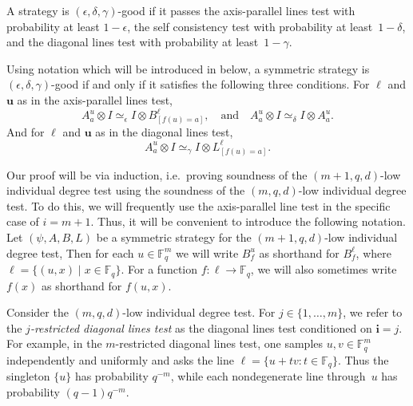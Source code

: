 \documentclass[11pt]{article}
\theoremstyle{definition}
\newcommand{\F}{\mathbb F}
\newcommand{\eps}{\epsilon}
\newcommand{\ot}{\otimes}
\newcommand{\bi}{\boldsymbol{i}}
\newcommand{\bell}{\boldsymbol{\ell}}
\newcommand{\bu}{\boldsymbol{u}}
\begin{document}
\begin{definition}
A strategy is $(\eps, \delta, \gamma)$-good if it
passes the axis-parallel lines test with probability at least $1-\eps$,
the self consistency test with probability at least~$1-\delta$,
and the diagonal lines test with probability at least~$1-\gamma$.
\end{definition}

\begin{remark}\label{rem:good-strat-characterization}
Using notation which will be introduced in  below,
a symmetric strategy is $(\eps, \delta, \gamma)$-good
if and only if it satisfies the following three conditions.
For $\bell$ and $\bu$ as in the axis-parallel lines test,
\begin{equation*}
A^u_a \ot I \simeq_{\eps} I \ot B^{\ell}_{[f(u)=a]},
\quad
\text{and}
\quad
A^u_a \ot I \simeq_{\delta} I \ot A^u_a.
\end{equation*}
And for $\bell$ and $\bu$ as in the diagonal lines test,
\begin{equation*}
A^u_a \ot I \simeq_{\gamma} I \ot L^{\ell}_{[f(u)=a]}.
\end{equation*}
\end{remark}

\begin{notation}\label{not:conditioned-on-last-direction}
Our proof will be via induction,
i.e.\ proving soundness of the $(m+1,q,d)$-low individual degree test
using the soundness of the $(m,q,d)$-low individual degree test.
To do this, we will frequently use the axis-parallel line test in the specific case of $i = m+1$.
Thus, it will be convenient to introduce the following notation.
Let $(\psi, A, B, L)$ be a symmetric strategy for the $(m+1, q, d)$-low individual degree test,
Then for each $u \in \F_q^m$ we will write $B^u_f$ as shorthand for $B^{\ell}_f$,
where $\ell = \{(u, x) \mid x \in \F_q\}$.
For a function $f:\ell \rightarrow \F_q$,
we will also sometimes write $f(x)$ as shorthand for $f(u,x)$.
\end{notation}

\begin{definition}
Consider the $(m,q,d)$-low individual degree test.
For $j \in \{1, \ldots, m\}$,
we refer to the \emph{$j$-restricted diagonal lines test}
as the diagonal lines test conditioned on $\bi = j$.
For example, in the $m$-restricted diagonal lines test, one samples
$u,v\in\F_q^m$ independently and uniformly and asks the line
$\ell=\{u+tv:t\in\F_q\}$.  Thus the singleton $\{u\}$ has
probability $q^{-m}$, while each nondegenerate line through~$u$ has
probability $(q-1)q^{-m}$.
\end{definition}
\end{document}
